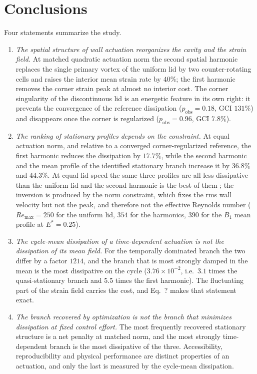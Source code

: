 \documentclass[11pt,a4paper]{article}
\newenvironment{chgdel}{\par\color{red}}{\par\color{black}}
\begin{document}
\section{Conclusions}
\label{sec:conclusions}

\begin{chgdel}
Four statements summarize the study.

\begin{enumerate}
\item \emph{The spatial structure of wall actuation reorganizes the cavity and the
strain field.} At matched quadratic actuation norm the second spatial harmonic
replaces the single primary vortex of the uniform lid by two counter-rotating
cells and raises the interior mean strain rate by $40\%$; the first harmonic
removes the corner strain peak at almost no interior cost. The corner singularity
of the discontinuous lid is an energetic feature in its own right: it prevents the
convergence of the reference dissipation ($p_{\mathrm{obs}}=0.18$,
GCI $131\%$) and disappears once the corner is regularized
($p_{\mathrm{obs}}=0.96$, GCI $7.8\%$).
\item \emph{The ranking of stationary profiles depends on the constraint.} At
equal actuation norm, and relative to a converged corner-regularized reference,
the first harmonic reduces the dissipation by $17.7\%$, while the second harmonic
and the mean profile of the identified stationary branch increase it by $36.8\%$
and $44.3\%$. At equal lid speed the same three profiles are all less dissipative
than the uniform lid and the second harmonic is the best of them
; the inversion is produced by the norm constraint, which
fixes the rms wall velocity but not the peak, and therefore not the effective
Reynolds number ($Re_{\max}=250$ for the uniform lid, $354$ for the harmonics,
$390$ for the $B_1$ mean profile at $E^\ast=0.25$).
\item \emph{The cycle-mean dissipation of a time-dependent actuation is not the
dissipation of its mean field.} For the temporally dominated branch the two
differ by a factor $1214$, and the branch that is most strongly damped in the mean
is the most dissipative on the cycle ($3.76\times10^{-2}$, i.e.\ $3.1$ times the
quasi-stationary branch and $5.5$ times the first harmonic). The fluctuating part
of the strain field carries the cost, and Eq.~? makes that
statement exact.
\item \emph{The branch recovered by optimization is not the branch that minimizes
dissipation at fixed control effort.} The most frequently recovered stationary
structure is a net penalty at matched norm, and the most strongly time-dependent
branch is the most dissipative of the three. Accessibility, reproducibility and
physical performance are distinct properties of an actuation, and only the last is
measured by the cycle-mean dissipation.
\end{enumerate}
\end{chgdel}
\end{document}
